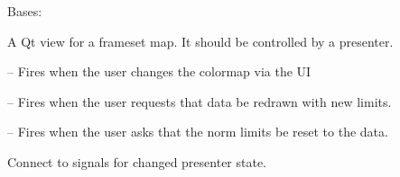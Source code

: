 \documentclass[letterpaper,10pt,english]{sphinxmanual}
\begin{document}
\begin{fulllineitems}
\label{\detokenize{xanespy:xanespy.qt_map_view.QtMapView}}
Bases: 

A Qt view for a frameset map. It should be controlled by a
presenter.

\begin{fulllineitems}
\label{\detokenize{xanespy:xanespy.qt_map_view.QtMapView.cmap_changed}}
 -- Fires when the user changes the colormap via the UI

\end{fulllineitems}


\begin{fulllineitems}
\label{\detokenize{xanespy:xanespy.qt_map_view.QtMapView.limits_applied}}
 -- Fires when the user requests that data be redrawn with new limits.

\end{fulllineitems}


\begin{fulllineitems}
\label{\detokenize{xanespy:xanespy.qt_map_view.QtMapView.limits_reset}}
 -- Fires when the user asks that the norm limits be reset to the data.

\end{fulllineitems}


\begin{fulllineitems}
\end{fulllineitems}


\begin{fulllineitems}
\label{\detokenize{xanespy:xanespy.qt_map_view.QtMapView.connect_presenter}}
Connect to signals for changed presenter state.


\end{fulllineitems}
\end{fulllineitems}
\end{document}

